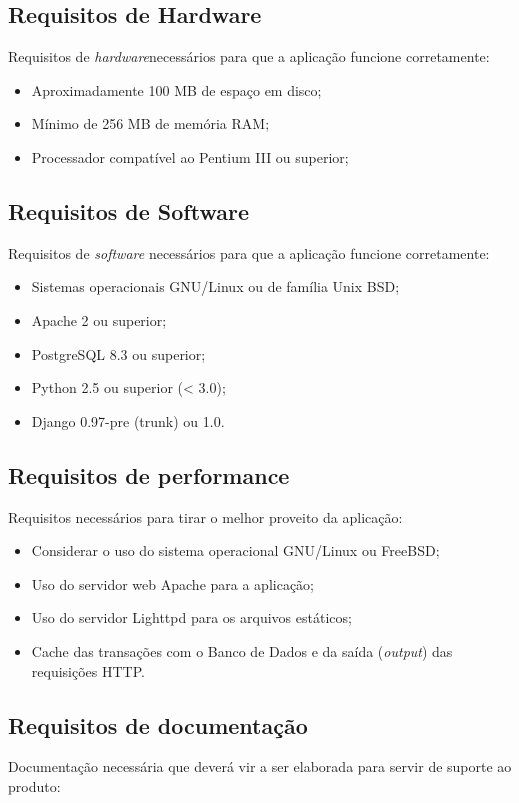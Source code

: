 \subsection{Requisitos de Hardware}
Requisitos de \textit{hardware}necessários para que a aplicação
funcione corretamente:

\begin{itemize}
\item Aproximadamente 100 MB de espaço em disco;
\item Mínimo de 256 MB de memória RAM;
\item Processador compatível ao Pentium III ou superior;
\end{itemize}

\subsection{Requisitos de Software}
Requisitos de \textit{software} necessários para que a aplicação
funcione corretamente:

\begin{itemize}
\item Sistemas operacionais GNU/Linux ou de família Unix BSD;
\item Apache 2 ou superior;
\item PostgreSQL 8.3 ou superior;
\item Python 2.5 ou superior (< 3.0);
\item Django 0.97-pre (trunk) ou 1.0.
\end{itemize}

\subsection{Requisitos de performance}
Requisitos necessários para tirar o melhor proveito da aplicação:

\begin{itemize}
\item Considerar o uso do sistema operacional GNU/Linux ou FreeBSD;
\item Uso do servidor web Apache para a aplicação;
\item Uso do servidor Lighttpd para os arquivos estáticos;
\item Cache das transações com o Banco de Dados e da saída
  (\textit{output}) das requisições HTTP.
\end{itemize}

\subsection{Requisitos de documentação}
Documentação necessária que deverá vir a ser elaborada para servir de
suporte ao produto:

